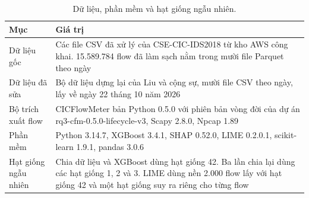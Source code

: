\documentclass[conference]{IEEEtran}
\begin{document}
\begin{table}[h]
\caption{Dữ liệu, phần mềm và hạt giống ngẫu nhiên.}
\label{tab:inventory}
\centering
\footnotesize
\setlength{\tabcolsep}{3pt}
\begin{tabular}{>{\raggedright\arraybackslash}p{1.0in}>{\raggedright\arraybackslash}p{2.25in}}
\toprule
Mục & Giá trị \\
\midrule
Dữ liệu gốc & Các file CSV đã xử lý của CSE-CIC-IDS2018 từ kho AWS công khai. 15.589.784 flow đã làm sạch nằm trong mười file Parquet theo ngày \\
Dữ liệu đã sửa & Bộ dữ liệu dựng lại của Liu và cộng sự, mười file CSV theo ngày, lấy về ngày 22 tháng 10 năm 2026 \\
Bộ trích xuất flow & CICFlowMeter bản Python 0.5.0 với phiên bản vòng đời của dự án rq3-cfm-0.5.0-lifecycle-v3, Scapy 2.8.0, Npcap 1.89 \\
Phần mềm & Python 3.14.7, XGBoost 3.4.1, SHAP 0.52.0, LIME 0.2.0.1, scikit-learn 1.9.1, pandas 3.0.6 \\
Hạt giống ngẫu nhiên & Chia dữ liệu và XGBoost dùng hạt giống 42. Ba lần chia lại dùng các hạt giống 1, 2 và 3. LIME dùng nền 2.000 flow lấy với hạt giống 42 và một hạt giống suy ra riêng cho từng flow \\
\bottomrule
\end{tabular}
\end{table}

\balance


\end{document}
